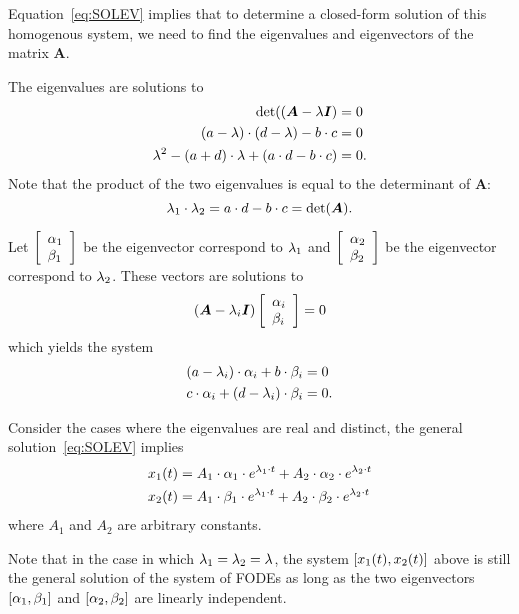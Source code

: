 \documentclass[letterpaper,12pt,leqno]{article}
\begin{document}
Equation~\eqref{eq:SOLEV} implies that to determine a closed-form solution of this homogenous system, we need to find the eigenvalues and eigenvectors of the matrix $\bm{A}$.

The eigenvalues are solutions to 
\begin{align*}
\det( \left( \bm{A}-\lambda \bm{I} \right) &=0\\
\left( a-\lambda \right) \cdot \left( d-\lambda \right) -b\cdot c &=0 \\
\lambda ^{2}-\left( a+d \right)\cdot  \lambda +\left( a\cdot d-b\cdot c \right) &=0.
\end{align*}
Note that the product of the two eigenvalues is equal to the determinant of $
\bm{A}$:
\begin{equation}
\lambda_{1}\cdot \lambda_{2}=a\cdot d-b\cdot c=\det(\bm{A}).\label{eq:DETL}
\end{equation}

Let $\left[ 
\begin{array}{l}
\alpha_{1} \\ 
\beta_{1}
\end{array}
 \right] $ be the eigenvector correspond to $\lambda_{1}$ and $\left[ 
\begin{array}{l}
\alpha_{2} \\ 
\beta_{2}
\end{array} \right] $ be the eigenvector correspond to $\lambda_{2}$. These vectors are solutions to 
\begin{equation*}
\left( \bm{A}-\lambda_{i}\bm{I} \right) \left[ 
\begin{array}{l}
\alpha_{i} \\ 
\beta_{i}
\end{array} \right] =0
\end{equation*}
which yields the system
\begin{align*}
\left( a-\lambda_{i} \right)\cdot  \alpha_{i}+b\cdot \beta _{i} &=0 \\
c\cdot \alpha_{i}+\left( d-\lambda_{i} \right)\cdot  \beta _{i} &=0.
\end{align*}

Consider the cases where the eigenvalues are real and distinct, the general
solution~\eqref{eq:SOLEV} implies
\begin{align*}
x_{1}(t) &=A_{1}\cdot \alpha_{1}\cdot e^{\lambda_{1}\cdot t}+A_{2}\cdot \alpha_{2}\cdot e^{\lambda_{2}\cdot t}\\
x_{2}(t) &=A_{1}\cdot \beta_{1}\cdot e^{\lambda_{1}\cdot t}+A_{2}\cdot \beta_{2}\cdot e^{\lambda_{2}\cdot t} 
\end{align*}
where $A_{1}$ and $A_{2}$ are arbitrary constants. 

Note that in the case in which $\lambda_{1}=\lambda_{2}=\lambda$, the system $\left[ x_{1}(t),x_{2}(t) \right]$ above is still the general solution of the system of FODEs as long as the two eigenvectors $\left[ \alpha_{1},\beta_{1} \right]$ and $\left[ \alpha_{2},\beta_{2} \right]$ are linearly independent.
\end{document}
